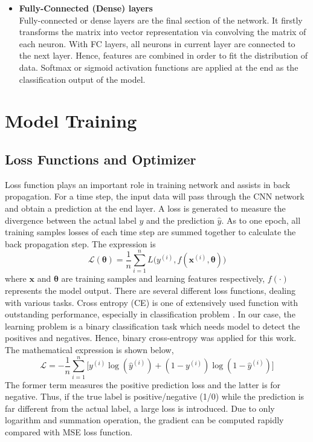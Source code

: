 \begin{itemize}[leftmargin=*]
	\item\textbf{Fully-Connected (Dense) layers}\\
	Fully-connected or dense layers are the final section of the network. It firstly transforms the matrix into vector representation via convolving the matrix of each neuron. With FC layers, all neurons in current layer are connected to the next layer. Hence, features are combined in order to fit the distribution of data. Softmax or sigmoid activation functions are applied at the end as the classification output of the model.
\end{itemize}
\section{Model Training}
\subsection{Loss Functions and Optimizer}
Loss function plays an important role in training network and assists in back propagation. For a time step, the input data will pass through the CNN network and obtain a prediction at the end layer. A loss is generated to measure the divergence between the actual label $y$ and the prediction $\hat y$. As to one epoch, all training samples losses of each time step are summed together to calculate the back propagation step. The expression is 
\begin{equation}
\boldsymbol{\mathcal{L}}(\boldsymbol{\theta})=\frac{1}{n}\sum_{i=1}^{n}L\big(y^{(i)},f(\mathbf{x}^{(i)},\boldsymbol{\theta})\big)
\end{equation}
where $\mathbf{x}$ and $\boldsymbol{\theta}$ are training samples and learning features respectively, $f(\cdot)$ represents the model output. There are several different loss functions, dealing with various tasks. Cross entropy (CE) is one of extensively used function with outstanding performance, especially in classification problem \cite{simard2003best}. In our case, the learning problem is a binary classification task which needs model to detect the positives and negatives. Hence, binary cross-entropy was applied for this work. The mathematical expression is shown below,
\begin{equation}
\boldsymbol{\mathcal{L}}=-\frac{1}{n}\sum_{i=1}^{n}\big[y^{(i)}\log(\hat{y}^{(i)})+(1-y^{(i)})\log(1-\hat{y}^{(i)})\big]
\label{eq:loss}
\end{equation}
The former term measures the positive prediction loss and the latter is for negative. Thus, if the true label is positive/negative (1/0) while the prediction is far different from the actual label, a large loss is introduced. Due to only logarithm and summation operation, the gradient can be computed rapidly compared with MSE loss function. 

